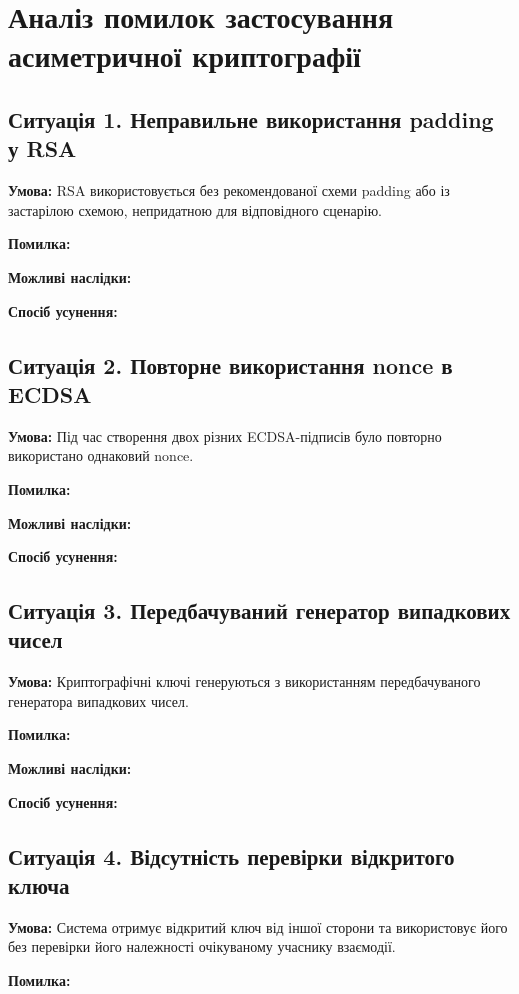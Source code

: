 \section{Аналіз помилок застосування асиметричної криптографії}

\subsection{Ситуація 1. Неправильне використання padding у RSA}

\textbf{Умова:} RSA використовується без рекомендованої схеми padding або із застарілою схемою, непридатною для відповідного сценарію.

\textbf{Помилка:}

\textbf{Можливі наслідки:}

\textbf{Спосіб усунення:}

\subsection{Ситуація 2. Повторне використання nonce в ECDSA}

\textbf{Умова:} Під час створення двох різних ECDSA-підписів було повторно використано однаковий nonce.

\textbf{Помилка:}

\textbf{Можливі наслідки:}

\textbf{Спосіб усунення:}

\subsection{Ситуація 3. Передбачуваний генератор випадкових чисел}

\textbf{Умова:} Криптографічні ключі генеруються з використанням передбачуваного генератора випадкових чисел.

\textbf{Помилка:}

\textbf{Можливі наслідки:}

\textbf{Спосіб усунення:}

\subsection{Ситуація 4. Відсутність перевірки відкритого ключа}

\textbf{Умова:} Система отримує відкритий ключ від іншої сторони та використовує його без перевірки його належності очікуваному учаснику взаємодії.

\textbf{Помилка:}

